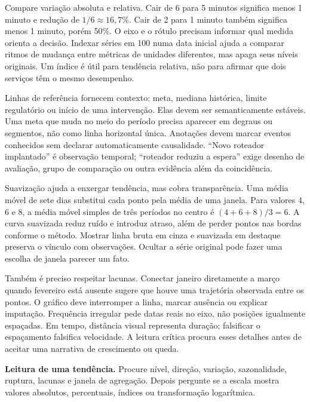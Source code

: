 Compare variação absoluta e relativa. Cair de 6 para 5 minutos significa menos 1 minuto e redução de $1/6\approx16{,}7\%$. Cair de 2 para 1 minuto também significa menos 1 minuto, porém 50\%. O eixo e o rótulo precisam informar qual medida orienta a decisão. Indexar séries em 100 numa data inicial ajuda a comparar ritmos de mudança entre métricas de unidades diferentes, mas apaga seus níveis originais. Um índice é útil para tendência relativa, não para afirmar que dois serviços têm o mesmo desempenho.

Linhas de referência fornecem contexto: meta, mediana histórica, limite regulatório ou início de uma intervenção. Elas devem ser semanticamente estáveis. Uma meta que muda no meio do período precisa aparecer em degraus ou segmentos, não como linha horizontal única. Anotações devem marcar eventos conhecidos sem declarar automaticamente causalidade. ``Novo roteador implantado'' é observação temporal; ``roteador reduziu a espera'' exige desenho de avaliação, grupo de comparação ou outra evidência além da coincidência.

Suavização ajuda a enxergar tendência, mas cobra transparência. Uma média móvel de sete dias substitui cada ponto pela média de uma janela. Para valores 4, 6 e 8, a média móvel simples de três períodos no centro é $(4+6+8)/3=6$. A curva suavizada reduz ruído e introduz atraso, além de perder pontos nas bordas conforme o método. Mostrar linha bruta em cinza e suavizada em destaque preserva o vínculo com observações. Ocultar a série original pode fazer uma escolha de janela parecer um fato.

Também é preciso respeitar lacunas. Conectar janeiro diretamente a março quando fevereiro está ausente sugere que houve uma trajetória observada entre os pontos. O gráfico deve interromper a linha, marcar ausência ou explicar imputação. Frequência irregular pede datas reais no eixo, não posições igualmente espaçadas. Em tempo, distância visual representa duração; falsificar o espaçamento falsifica velocidade. A leitura crítica procura esses detalhes antes de aceitar uma narrativa de crescimento ou queda.

\begin{GuidedBox}
\textbf{Leitura de uma tendência.} Procure nível, direção, variação, sazonalidade, ruptura, lacunas e janela de agregação. Depois pergunte se a escala mostra valores absolutos, percentuais, índices ou transformação logarítmica.
\end{GuidedBox}




